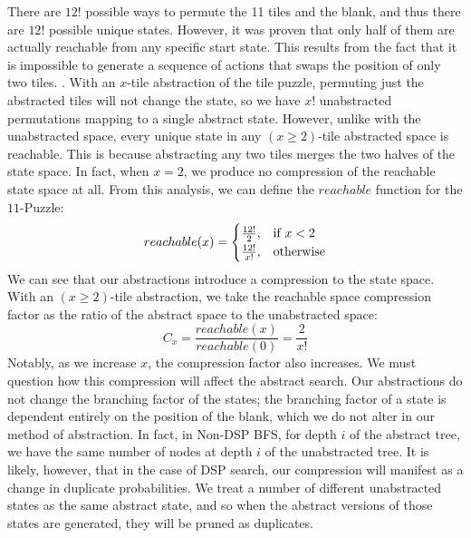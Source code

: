 \documentclass{article}
\begin{document}
There are \(12!\) possible ways to permute the 11 tiles and the blank,
and thus there are \(12!\) possible unique states.
However, it was proven that only half of them are actually reachable from any specific start state.
This results from the fact that it is impossible to generate a sequence of
actions that swaps the position of only two tiles.
\citep{johnson1879notes}.
With an \(x\)-tile abstraction of the tile puzzle,
permuting just the abstracted tiles will not change the state,
so we have \( x! \) unabstracted permutations mapping to a single abstract state.
However, unlike with the unabstracted space, 
every unique state in any \((x\geq2)\)-tile abstracted space is reachable.
This is because abstracting any two tiles merges the two halves of the state space.
In fact, when \(x = 2\), we produce no compression of the reachable state space at all.
From this analysis, we can define the \( reachable \) function for the \(11\)-Puzzle:
$$
   reachable(x) = \begin{cases}
   {{12!} \over {2}}, & \text{if } x < 2 \\
   {{12!} \over {x!}}, & \text{otherwise}
   \end{cases}
   $$
   We can see that our abstractions introduce a compression to the state space.
   With an \((x\geq2)\)-tile abstraction, we take the reachable space compression factor
   as the ratio of the abstract space to the unabstracted space:
   \[C_x = \frac{reachable(x)} {reachable(0)} = \frac{2}{x!}\]
   Notably, as we increase \(x\), the compression factor also increases.
   We must question how this compression will affect the abstract search.
   Our abstractions do not change the branching factor of the states;
   the branching factor of a state is dependent entirely on the position of the blank,
   which we do not alter in our method of abstraction.
   In fact, in Non-DSP BFS, for depth \(i\) of the abstract tree,
   we have the same number of nodes at depth \(i\) of the unabstracted tree.
   It is likely, however, that in the case of DSP search,
   our compression will manifest as a change in duplicate probabilities.
   We treat a number of different unabstracted states as the same abstract state,
   and so when the abstract versions of those states are generated,
   they will be pruned as duplicates. \\
\end{document}
